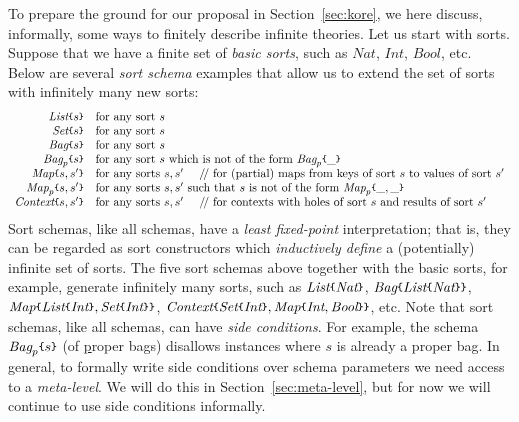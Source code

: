 \documentclass[UTF8,11pt]{article}
\theoremstyle{plain}
\theoremstyle{definition}
\theoremstyle{remark}
\newcommand{\Nat}{\textit{Nat}}
\newcommand{\Int}{\textit{Int}}
\newcommand{\Bool}{\textit{Bool}}
\newcommand{\List}{\textit{List}}
\newcommand{\Bag}{\textit{Bag}}
\newcommand{\Set}{\textit{Set}}
\newcommand{\Map}{\textit{Map}}
\newcommand{\Context}{\textit{Context}}
\newcommand{\parametric}[2]{{#1}\raisebox{.2ex}{\texttt{\footnotesize{\{}}}#2\raisebox{.2ex}{\texttt{\footnotesize{\}}}}}
\newcommand{\doubleslash}{/\!/{ }}
\begin{document}
To prepare the ground for our proposal in Section~\ref{sec:kore},
we here discuss, informally, some ways to finitely describe infinite theories.
Let us start with sorts.
Suppose that we have a finite set of \emph{basic sorts}, such as
$\Nat$, $\Int$, $\Bool$, etc.
Below are several \emph{sort schema} examples that allow us to extend the set
of sorts with infinitely many new sorts:
$$
\begin{array}{rl}
\parametric{\List}{s} &
\textrm{for any sort $s$} \\
\parametric{\Set}{s} &
\textrm{for any sort $s$} \\
\parametric{\Bag}{s} &
\textrm{for any sort $s$} \\
\parametric{\Bag_p}{s} &
\textrm{for any sort $s$ which is not of the form $\parametric{\Bag_p}{\_}$} \\
\parametric{\Map}{s,s'} &
\textrm{for any sorts $s,s'$ \ \ \ \doubleslash for (partial) maps from keys of 
sort 
$s$ to values of sort $s'$} \\
\parametric{\Map_p}{s,s'} &
\textrm{for any sorts $s,s'$ such that $s$ is not of the form $\parametric{\Map_p}{\_,\_}$}
\\
\parametric{\Context}{s,s'} &
\textrm{for any sorts $s,s'$ \ \ \ \doubleslash for contexts with holes of sort 
$s$ and results of sort $s'$}
\end{array}
$$
Sort schemas, like all schemas, have a \emph{least fixed-point}
interpretation;
that is, they can be regarded as sort constructors which
{\em inductively define} a (potentially) infinite set of sorts.
The five sort schemas above together with the basic sorts, for example,
generate infinitely many sorts, such as
$\parametric{\List}{\Nat}$,
$\parametric{\Bag}{\parametric{\List}{\Nat}}$,
$\parametric{\Map}{\parametric{\List}{\Int},\parametric{\Set}{\Int}}$,
$\parametric{\Context}{\parametric{\Set}{\Int},\parametric{\Map}{\Int,\Bool}}$,
etc.
Note that sort schemas, like all schemas, can have \emph{side conditions}.
For example, the schema $\parametric{\Bag_p}{s}$ (of \underline{p}roper bags)
disallows instances where $s$ is already a proper bag.
In general, to formally write side conditions over schema parameters we need
access to a \emph{meta-level}.
We will do this in Section~\ref{sec:meta-level}, but for now we will continue
to use side conditions informally.
\end{document}
